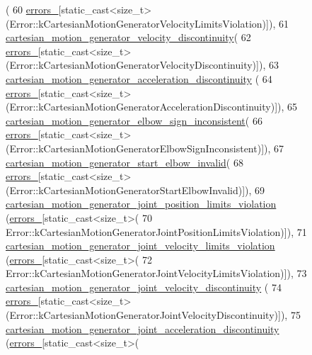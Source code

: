 \begin{DoxyCode}
      (
60           \hyperlink{structfranka_1_1Errors_ab269bb0ad30eb1aaa7009a246be8e8aa}{errors\_}[static\_cast<size\_t>(Error::kCartesianMotionGeneratorVelocityLimitsViolation)]),
61       \hyperlink{structfranka_1_1Errors_a17e4a9b6b7dc4cc12c1328d36cac3eaf}{cartesian\_motion\_generator\_velocity\_discontinuity}(
62           \hyperlink{structfranka_1_1Errors_ab269bb0ad30eb1aaa7009a246be8e8aa}{errors\_}[static\_cast<size\_t>(Error::kCartesianMotionGeneratorVelocityDiscontinuity)]),
63       \hyperlink{structfranka_1_1Errors_a10c6ac36bf48b4a9edf91e74d9bc4837}{cartesian\_motion\_generator\_acceleration\_discontinuity}
      (
64           \hyperlink{structfranka_1_1Errors_ab269bb0ad30eb1aaa7009a246be8e8aa}{errors\_}[static\_cast<size\_t>(Error::kCartesianMotionGeneratorAccelerationDiscontinuity)]),
65       \hyperlink{structfranka_1_1Errors_a58b0e1199c9dded5a32bfeb110e63037}{cartesian\_motion\_generator\_elbow\_sign\_inconsistent}(
66           \hyperlink{structfranka_1_1Errors_ab269bb0ad30eb1aaa7009a246be8e8aa}{errors\_}[static\_cast<size\_t>(Error::kCartesianMotionGeneratorElbowSignInconsistent)]),
67       \hyperlink{structfranka_1_1Errors_a6d905b803bbe8a7be8490f2a94ba524a}{cartesian\_motion\_generator\_start\_elbow\_invalid}(
68           \hyperlink{structfranka_1_1Errors_ab269bb0ad30eb1aaa7009a246be8e8aa}{errors\_}[static\_cast<size\_t>(Error::kCartesianMotionGeneratorStartElbowInvalid)]),
69       \hyperlink{structfranka_1_1Errors_a73aef7473fd6d1d5b207e68fa35948c5}{cartesian\_motion\_generator\_joint\_position\_limits\_violation}
      (\hyperlink{structfranka_1_1Errors_ab269bb0ad30eb1aaa7009a246be8e8aa}{errors\_}[static\_cast<size\_t>(
70           Error::kCartesianMotionGeneratorJointPositionLimitsViolation)]),
71       \hyperlink{structfranka_1_1Errors_a435d16d62a123bfbf578bc76e3780605}{cartesian\_motion\_generator\_joint\_velocity\_limits\_violation}
      (\hyperlink{structfranka_1_1Errors_ab269bb0ad30eb1aaa7009a246be8e8aa}{errors\_}[static\_cast<size\_t>(
72           Error::kCartesianMotionGeneratorJointVelocityLimitsViolation)]),
73       \hyperlink{structfranka_1_1Errors_a1c8c56766fefc19fda5d5de909ca5b37}{cartesian\_motion\_generator\_joint\_velocity\_discontinuity}
      (
74           \hyperlink{structfranka_1_1Errors_ab269bb0ad30eb1aaa7009a246be8e8aa}{errors\_}[static\_cast<size\_t>(Error::kCartesianMotionGeneratorJointVelocityDiscontinuity)]),
75       \hyperlink{structfranka_1_1Errors_a2e223ef3c771709a6a3f094adf12f9cb}{cartesian\_motion\_generator\_joint\_acceleration\_discontinuity}
      (\hyperlink{structfranka_1_1Errors_ab269bb0ad30eb1aaa7009a246be8e8aa}{errors\_}[static\_cast<size\_t>(

\end{DoxyCode}
